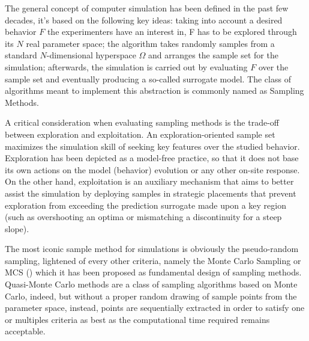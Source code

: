 \documentclass[12pt]{article}
\begin{document}
The general concept of computer simulation has been defined in the past few decades, it's based on the following key ideas: taking into account a desired behavior $ F $ the experimenters have an interest in, F has to be explored through its $ N $ real parameter space; the algorithm takes randomly samples from a standard $ N $-dimensional hyperspace $ \Omega $ and arranges the sample set for the simulation; afterwards, the simulation is carried out by evaluating $ F $ over the sample set and eventually producing a so-called surrogate model. The class of algorithms meant to implement this abstraction is commonly named as Sampling Methods.

A critical consideration when evaluating sampling methods is the trade-off between exploration and exploitation. An exploration-oriented sample set maximizes the simulation skill of seeking key features over the studied behavior. Exploration has been depicted as a model-free practice, so that it does not base its own actions on the model (behavior) evolution or any other on-site response. On the other hand, exploitation is an auxiliary mechanism that aims to better assist the simulation by deploying samples in strategic placements that prevent exploration from exceeding the prediction surrogate made upon a key region (such as overshooting an optima or mismatching a discontinuity for a steep slope).

The most iconic sample method for simulations is obviously the pseudo-random sampling, lightened of every other criteria, namely the Monte Carlo Sampling or MCS ()  which it has been proposed as fundamental design of sampling methods. Quasi-Monte Carlo methods are a class of sampling algorithms based on Monte Carlo, indeed, but without a proper random drawing of sample points from the parameter space, instead, points are sequentially extracted in order to satisfy one or multiples criteria as best as the computational time required remains acceptable.
 
\end{document}
